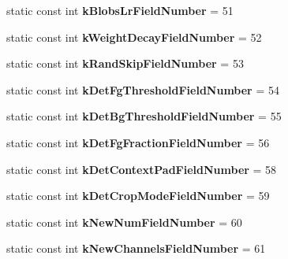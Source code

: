 \begin{DoxyCompactItemize}
static const int {\bfseries k\+Blobs\+Lr\+Field\+Number} = 51
\item 
\mbox{\label{classcaffe_1_1_v0_layer_parameter_a2be2a5ba5b87465f14b7061a1bb99a6b}} 
static const int {\bfseries k\+Weight\+Decay\+Field\+Number} = 52
\item 
\mbox{\label{classcaffe_1_1_v0_layer_parameter_a7b68b68d6bdf8b707834b34d0a84d6ab}} 
static const int {\bfseries k\+Rand\+Skip\+Field\+Number} = 53
\item 
\mbox{\label{classcaffe_1_1_v0_layer_parameter_ade2620b9a8501fdc13231f4c03b63b15}} 
static const int {\bfseries k\+Det\+Fg\+Threshold\+Field\+Number} = 54
\item 
\mbox{\label{classcaffe_1_1_v0_layer_parameter_a8573d18cf056dc910fa42e9172864c6b}} 
static const int {\bfseries k\+Det\+Bg\+Threshold\+Field\+Number} = 55
\item 
\mbox{\label{classcaffe_1_1_v0_layer_parameter_aa8378617e9cedd142477972ced139996}} 
static const int {\bfseries k\+Det\+Fg\+Fraction\+Field\+Number} = 56
\item 
\mbox{\label{classcaffe_1_1_v0_layer_parameter_a10faea85278eb2da5b538dd575f2e275}} 
static const int {\bfseries k\+Det\+Context\+Pad\+Field\+Number} = 58
\item 
\mbox{\label{classcaffe_1_1_v0_layer_parameter_a6c16ef7498a52fcf56553cb9f5a2f1da}} 
static const int {\bfseries k\+Det\+Crop\+Mode\+Field\+Number} = 59
\item 
\mbox{\label{classcaffe_1_1_v0_layer_parameter_a880fe815f71a38e484bb7978746af7f9}} 
static const int {\bfseries k\+New\+Num\+Field\+Number} = 60
\item 
\mbox{\label{classcaffe_1_1_v0_layer_parameter_a631ff9e1195c864e82e4e021efde7d8d}} 
static const int {\bfseries k\+New\+Channels\+Field\+Number} = 61
\item 

\end{DoxyCompactItemize}
